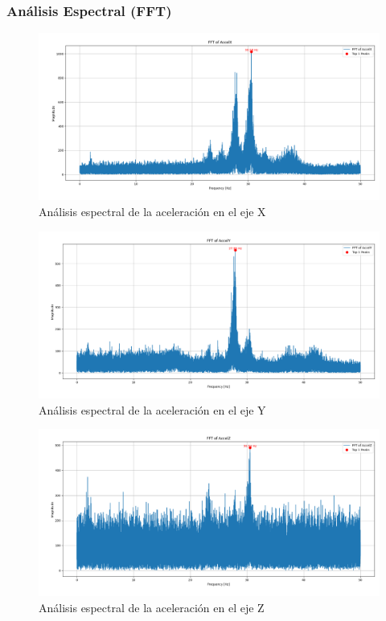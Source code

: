 \documentclass{article}
\begin{document}
\subsubsection{Análisis Espectral (FFT)}
\begin{figure}[H]
    \centering
    \includegraphics[width=\textwidth]{fftx.png}
    \caption{Análisis espectral de la aceleración en el eje X}
    \label{fig:my_label}
\end{figure}
\begin{figure}[H]
    \centering
    \includegraphics[width=\textwidth]{ffty.png}
    \caption{Análisis espectral de la aceleración en el eje Y}
    \label{fig:my_label}
\end{figure}
\begin{figure}[H]
    \centering
    \includegraphics[width=\textwidth]{fftz.png}
    \caption{Análisis espectral de la aceleración en el eje Z}
    \label{fig:my_label}
\end{figure}
\end{document}

